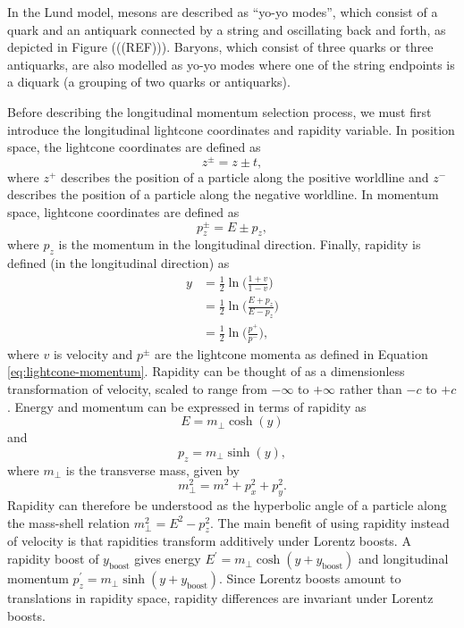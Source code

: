 \documentclass[12pt,a4paper]{report}
\begin{document}
In the Lund model, mesons are described as ``yo-yo modes'', which consist of a quark and an antiquark connected by a string and oscillating back and forth, as depicted in Figure (((REF))). Baryons, which consist of three quarks or three antiquarks, are also modelled as yo-yo modes where one of the string endpoints is a diquark (a grouping of two quarks or antiquarks).

Before describing the longitudinal momentum selection process, we must first introduce the longitudinal lightcone coordinates and rapidity variable. In position space, the lightcone coordinates are defined as
\begin{equation}
  z^\pm = z \pm t,
\end{equation}
where $z^+$ describes the position of a particle along the positive worldline and $z^-$ describes the position of a particle along the negative worldline. In momentum space, lightcone coordinates are defined as
\begin{equation}\label{eq:lightcone-momentum}
  p_z^\pm = E \pm p_z,
\end{equation}
where $p_z$ is the momentum in the longitudinal direction. Finally, rapidity is defined (in the longitudinal direction) as
\begin{align}
  y &= \frac{1}{2} \ln \Bigr( \frac{1+v}{1-v}\Bigr)  \nonumber \\
    &= \frac{1}{2} \ln \Bigr( \frac{E + p_z}{E - p_z} \Bigr) \nonumber \\
  &= \frac{1}{2} \ln \Bigr(\frac{p^+}{p^-}\Bigr),
\end{align}
where $v$ is velocity and $p^\pm$ are the lightcone momenta as defined in Equation \eqref{eq:lightcone-momentum}. Rapidity can be thought of as a dimensionless transformation of velocity, scaled to range from $-\infty$ to $+\infty$ rather than $-c$ to $+c$. Energy and momentum can be expressed in terms of rapidity as
\begin{equation}
  E = m_\perp \cosh(y)
\end{equation}
and
\begin{equation}
  p_z = m_\perp \sinh(y),
\end{equation}
where $m_\perp$ is the transverse mass, given by
\begin{equation}
  m_\perp^2 = m^2 + p_x^2 + p_y^2.
\end{equation}
Rapidity can therefore be understood as the hyperbolic angle of a particle along the mass-shell relation $m_\perp^2 = E^2 - p_z^2$. The main benefit of using rapidity instead of velocity is that rapidities transform additively under Lorentz boosts. A rapidity boost of $y_\text{boost}$ gives energy $E^\prime = m_\perp \cosh(y + y_\text{boost})$ and longitudinal momentum $p_z^\prime = m_\perp \sinh(y + y_\text{boost})$. Since Lorentz boosts amount to translations in rapidity space, rapidity differences are invariant under Lorentz boosts.
\end{document}
